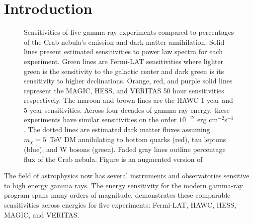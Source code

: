 \section{Introduction} \label{sec:gd_intro}

\begin{figure}[h]
    \caption{Sensitivities of five gamma-ray experiments compared to percentages of the Crab nebula's emission and dark matter annihilation. Solid lines present estimated sensitivities to power law spectra for each experiment. Green lines are Fermi-LAT sensitivities where lighter green is the sensitivity to the galactic center and dark green is its sensitivity to higher declinations. Orange, red, and purple solid lines represent the MAGIC, HESS, and VERITAS 50 hour sensitivities respectively. The maroon and brown lines are the HAWC 1 year and 5 year sensitivities. Across four decades of gamma-ray energy, these experiments have similar sensitivities on the order $10^{-12}$ erg cm$^{-2}$s$^{-1}$. The dotted lines are estimated dark matter fluxes assuming $m_{\chi} = 5$~TeV DM annihilating to bottom quarks (red), tau leptons (blue), and W bosons (green). Faded gray lines outline percentage flux of the Crab nebula. Figure is an augmented version of \cite{2020Galax...8...25R}}
    \label{fig:gd_motivation}
\end{figure}

The field of astrophysics now has several instruments and observatories sensitive to high energy gamma rays.
The energy sensitivity for the modern gamma-ray program spans many orders of magnitude.
 demonstrates these comparable sensitivities across energies for five experiments: Fermi-LAT, HAWC, HESS, MAGIC, and VERITAS.

